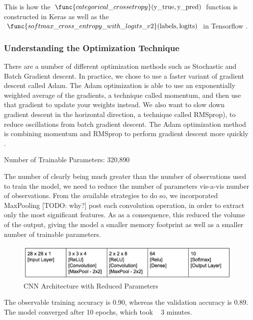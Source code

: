 \documentclass[12pt]{article}
\begin{document}
This is how the $\func{categorical\_crossetropy}(\text{y\_true}, \text{y\_pred})$ function is constructed in Keras \cite{chollet2015keras} as well as the
$\func{softmax\_cross\_entropy\_with\_logits\_v2}(\text{labels}, \text{logits})$
in Tensorflow \cite{tensorflow2015-whitepaper}. 

\subsubsection{Understanding the Optimization Technique}

There are a number of different optimization methods such as Stochastic
and Batch Gradient descent. In practice, we chose to use a faster variant
of gradient descent called Adam. The Adam optimization is able to use
an exponentially weighted average of the gradients, a technique called
momentum, and then use that gradient to update your weights instead. We
also want to slow down gradient descent in the horizontal direction, a
technique called RMSprop), to reduce oscillations from batch gradient descent.
The Adam optimization method is combining momentum and RMSprop to perform
gradient descent more quickly \cite{DeepLear51:online}.


Number of Trainable Parameters: 320,890


The number of clearly being much greater than the number of observations used
to train the model, we need to reduce the number of parameters vis-a-vis
number of observations. From the available strategies to do so, we
incorporated MaxPooling [TODO: why?] post each convolution operation, in
order to extract only the most significant features. As as a consequence,
this reduced the volume of the output, giving the model a smaller memory
footprint as well as a smaller number of trainable parameters.

\begin{figure}
  \begin{center}
    \includegraphics[scale=0.5]{fig4}
  \end{center}
  \caption{CNN Architecture with Reduced Parameters}
  \label{fig:cnnArchPool}
\end{figure}

The observable training accuracy is 0.90, whereas the validation accuracy is
0.89. The model converged after 10 epochs, which took ~ 3 minutes.
\end{document}
